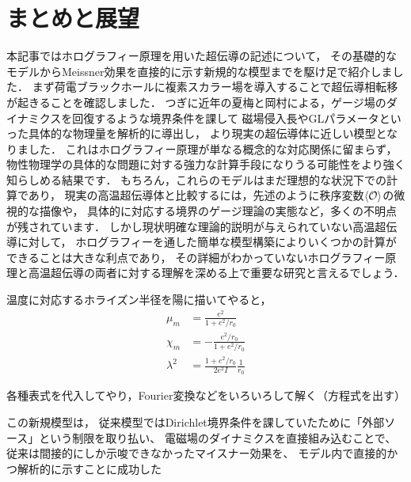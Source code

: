 \documentclass[b5paper,11pt,dvipdfmx]{jsarticle}
\numberwithin{equation}{section}
\theoremstyle{definition}
\begin{document}
\section{まとめと展望}
本記事ではホログラフィー原理を用いた超伝導の記述について，
その基礎的なモデルからMeissner効果を直接的に示す新規的な模型までを駆け足で紹介しました．
まず荷電ブラックホールに複素スカラー場を導入することで超伝導相転移が起きることを確認しました．
つぎに近年の夏梅と岡村による，ゲージ場のダイナミクスを回復するような境界条件を課して
磁場侵入長やGLパラメータといった具体的な物理量を解析的に導出し，
より現実の超伝導体に近しい模型となりました．
これはホログラフィー原理が単なる概念的な対応関係に留まらず，
物性物理学の具体的な問題に対する強力な計算手段になりうる可能性をより強く知らしめる結果です．
もちろん，これらのモデルはまだ理想的な状況下での計算であり，
現実の高温超伝導体と比較するには，先述のように秩序変数$\ev{\mathcal{O}}$の微視的な描像や，
具体的に対応する境界のゲージ理論の実態など，多くの不明点が残されています．
しかし現状明確な理論的説明が与えられていない高温超伝導に対して，
ホログラフィーを通した簡単な模型構築によりいくつかの計算ができることは大きな利点であり，
その詳細がわかっていないホログラフィー原理と高温超伝導の両者に対する理解を深める上で重要な研究と言えるでしょう．





\clearpage








温度に対応するホライズン半径を陽に描いてやると，
\begin{equation}
    \begin{split}
            \mu_m
            &= \frac{e^2}{1 + e^2 / r_0}\\
            \chi_m
            &= - \frac{e^2 / r_0}{1 + e^2 / r_0}\\
            \lambda^2
            &= \frac{1 + e^2 / r_0}{2 e^2 I}\frac{1}{r_0}
    \end{split}
\end{equation}


各種表式を代入してやり，Fourier変換などをいろいろして解く（方程式を出す）



この新規模型は，
従来模型ではDirichlet境界条件を課していたために「外部ソース」という制限を取り払い、
電磁場のダイナミクスを直接組み込むことで、従来は間接的にしか示唆できなかったマイスナー効果を、
モデル内で直接的かつ解析的に示すことに成功した
\end{document}

